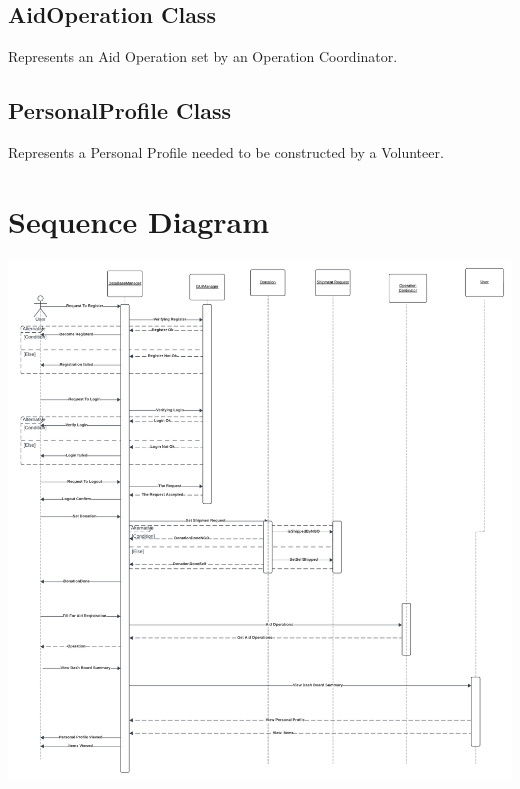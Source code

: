\documentclass[a4paper,12pt]{report}
\begin{document}
		\subsection{AidOperation Class}
			Represents an Aid Operation set by an Operation Coordinator.
		\subsection{PersonalProfile Class}
			Represents a Personal Profile needed to be constructed by a Volunteer.
		
	\section{Sequence Diagram}
	\begin{center}
		\includegraphics{Sequance Diagram (Large).png}
	\end{center}
\end{document}
